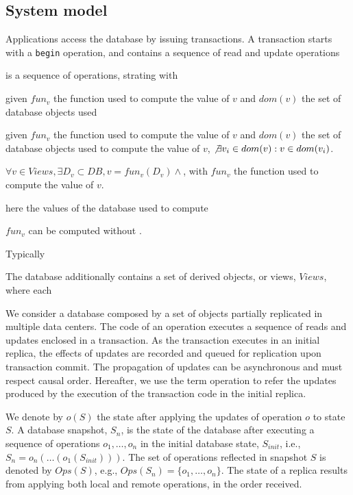 \documentclass{vldb}
\begin{document}
\subsection{System model}


Applications access the database by issuing transactions. A transaction starts with a \texttt{begin} operation, 
and contains a sequence of read and update operations 

is a sequence of operations,
strating with %




given  $fun_v$ the function used to compute the value of $v$ and $dom(v)$ the set of database objects used



given  $fun_v$ the function used to compute the value of $v$ and $dom(v)$ the set of database objects used
to compute the value of $v$, $\not \exists v_i \in dom(v): v \in dom(v_i)$.

 
$\forall v \in Views, \exists D_v \subset DB, v = fun_v(D_v)  \wedge $, with $fun_v$ the function used to compute 
the value of $v$. 

here the values of the database used to compute 


 $fun_v$ can be computed without .


Typically 

The database additionally contains a set of derived objects, or views, $Views$, where each 

 

We consider a database composed by a set of objects partially replicated in
multiple data centers.
The code of an operation executes a sequence of reads
and updates enclosed in a transaction.
As the transaction executes in an initial replica, the effects of updates are 
recorded and queued for replication upon transaction commit.
The propagation of updates can be asynchronous and must respect causal order.
Hereafter, we use the term operation to refer the updates produced by the 
execution of the transaction code in the initial replica.

We denote by $o(S)$ the state after applying the updates of
operation $o$ to state $S$.
A database snapshot, $S_n$, is the state of the database after
executing a sequence of operations $o_1,\ldots,o_n$
in the initial database state, $S_{init}$, i.e., $S_n =
o_n(\ldots(o_1(S_{init})))$.
The set of operations reflected in snapshot $S$ is denoted by $Ops(S)$,
e.g., $Ops(S_n) = \{o_1,\ldots,o_n\}$.
The state of a replica results from applying both local and remote
operations, in the order received.
\end{document}
